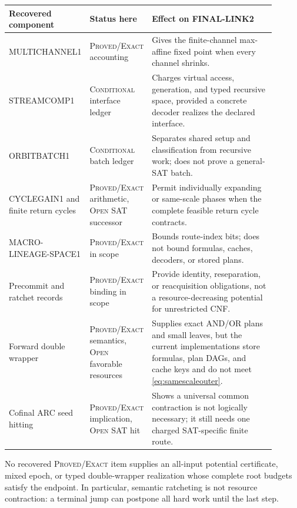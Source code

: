 \documentclass[11pt]{article}
\begin{document}
\begin{center}
\small
\begin{tabular}{p{0.22\linewidth}p{0.18\linewidth}p{0.50\linewidth}}
\toprule
Recovered component & Status here & Effect on FINAL-LINK2 \\
\midrule
MULTICHANNEL1 & \textsc{Proved/Exact} accounting & Gives the finite-channel
max-affine fixed point when every channel shrinks. \\
STREAMCOMP1 & \textsc{Conditional} interface ledger & Charges virtual access,
generation, and typed recursive space, provided a concrete decoder realizes
the declared interface. \\
ORBITBATCH1 & \textsc{Conditional} batch ledger & Separates shared setup and
classification from recursive work; does not prove a general-SAT batch. \\
CYCLEGAIN1 and finite return cycles & \textsc{Proved/Exact} arithmetic,
\textsc{Open} SAT successor & Permit individually expanding or same-scale
phases when the complete feasible return cycle contracts. \\
MACRO-LINEAGE-SPACE1 & \textsc{Proved/Exact} in scope & Bounds route-index bits;
does not bound formulas, caches, decoders, or stored plans. \\
Precommit and ratchet records & \textsc{Proved/Exact} binding in scope & Provide
identity, reseparation, or reacquisition obligations, not a resource-decreasing
potential for unrestricted CNF. \\
Forward double wrapper & \textsc{Proved/Exact} semantics,
\textsc{Open} favorable resources & Supplies exact AND/OR plans and small
leaves, but the current implementations store formulas, plan DAGs, and cache
keys and do not meet \eqref{eq:samescaleouter}. \\
Cofinal ARC seed hitting & \textsc{Proved/Exact} implication,
\textsc{Open} SAT hit & Shows a universal common contraction is not logically
necessary; it still needs one charged SAT-specific finite route. \\
\bottomrule
\end{tabular}
\end{center}

No recovered \textsc{Proved/Exact} item supplies an all-input potential
certificate, mixed epoch, or typed double-wrapper realization whose complete
root budgets satisfy the endpoint.  In particular, semantic ratcheting is not
resource contraction: a terminal jump can postpone all hard work until the
last step.
\end{document}
